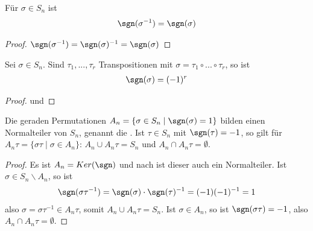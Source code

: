 \begin{conclusion}
	Für $\sigma\in S_n$ ist 
	\begin{align}
		\sgn(\sigma^{-1})=\sgn(\sigma)\notag
	\end{align}
\end{conclusion}
\begin{proof}
	$\sgn(\sigma^{-1})=\sgn(\sigma)^{-1}=\sgn(\sigma)$
\end{proof}

\begin{conclusion}
	Sei $\sigma\in S_n$. Sind $\tau_1,...,\tau_r$ Transpositionen mit $\sigma=\tau_1\circ ... \circ \tau_r$, so ist 
	\begin{align}
		\sgn(\sigma)=(-1)^r\notag
	\end{align}
\end{conclusion}
\begin{proof}
	 und 
\end{proof}

\begin{conclusion}
	Die geraden Permutationen $A_n=\{\sigma \in S_n \mid \sgn(\sigma)=1\}$ bilden einen Normalteiler von $S_n$, 
	genannt die . Ist $\tau\in S_n$ mit $\sgn(\tau)=-1$, so gilt für $A_n\tau=\{\sigma\tau \mid \sigma\in A_n\}$: 
	$A_n \cup A_n\tau = S_n$ und $A_n \cap A_n\tau=\emptyset$.
\end{conclusion}
\begin{proof}
	Es ist $A_n=Ker(\sgn)$ und nach  ist dieser auch ein Normalteiler. Ist $\sigma\in S_n\backslash A_n$, so ist 
	\begin{align}
		\sgn(\sigma\tau^{-1})=
		\sgn(\sigma)\cdot \sgn(\tau)^{-1}=(-1)(-1)^{-1}=1\notag
	\end{align}
	also $\sigma=\sigma\tau^{-1}\in A_n\tau$, somit $A_n\cup A_n\tau=S_n$. Ist 
	$\sigma\in A_n$, so ist $\sgn(\sigma\tau)=-1$, also $A_n\cap A_n\tau=\emptyset$.
\end{proof}